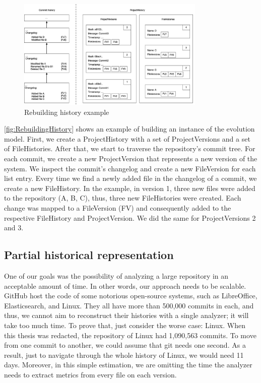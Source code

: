 \begin{figure}
    \begin{center}
        \includegraphics[width=0.8\textwidth]{RebuildingHistory.jpg}
    \end{center}
    \caption{Rebuilding history example}
    \label{fig:RebuildingHistory}
\end{figure}

\autoref{fig:RebuildingHistory} shows an example of building an instance of the evolution model.
First, we create a ProjectHistory with a set of ProjectVersions and a set of FileHistories.
After that, we start to traverse the repository's commit tree.
For each commit, we create a new ProjectVersion that represents a new version of the system. 
We inspect the commit's changelog and create a new FileVersion for each list entry.
Every time we find a newly added file in the changelog of a commit, we create a new FileHistory. 
In the example, in version 1, three new files were added to the repository (A, B, C), thus, three new FileHistories were created.
Each change was mapped to a FileVersion (FV) and consequently added to the respective FileHistory and ProjectVersion. 
We did the same for ProjectVersions 2 and 3. 

\label{sec:partialHistoricalRepr}
\subsection*{Partial historical representation}
One of our goals was the possibility of analyzing a large repository in an acceptable amount of time. 
In other words, our approach needs to be scalable.
GitHub host the code of some notorious open-source systems, such as LibreOffice, Elasticsearch, and Linux.
They all have more than 500,000 commits in each, and thus, we cannot aim to reconstruct their histories with a single analyzer; it will take too much time.  
To prove that, just consider the worse case: Linux. 
When this thesis was redacted, the repository of Linux had 1,090,563 commits. 
To move from one commit to another, we could assume that git needs one second. 
As a result, just to navigate through the whole history of Linux, we would need 11 days.
Moreover, in this simple estimation, we are omitting the time the analyzer needs to extract metrics from every file on each version. 

